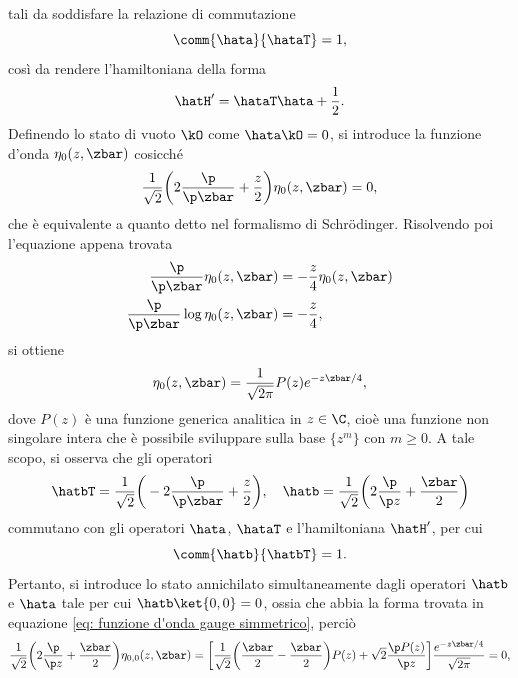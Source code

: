tali da soddisfare la relazione di commutazione 
\begin{equation}
    \comm{\hata}{\hataT} = 1,
\end{equation}
così da rendere l'hamiltoniana della forma
\begin{equation}
    \hatH' = \hataT\hata + \frac{1}{2}.
\end{equation}
Definendo lo stato di vuoto $\kO$ come $\hata\kO = 0$, si introduce la funzione d'onda $\eta_0(z,\zbar )$ cosicché 
\begin{equation}
\label{eq: funzione d'onda gauge simmetrico}
    \frac{1}{\sqrt{2}}\bigg(2\frac{\p}{\p \zbar } + \frac{z}{2}\bigg)\eta_0(z,\zbar ) = 0,
\end{equation}
che è equivalente a quanto detto nel formalismo di Schr\"odinger. Risolvendo poi l'equazione appena trovata
\begin{align}
    \frac{\p}{\p\zbar }\eta_0(z,\zbar) &= -\frac{z}{4}\eta_0(z,\zbar) \\
    \frac{\p}{\p\zbar}\log{\eta_0(z,\zbar)} &= -\frac{z}{4},
\end{align}
si ottiene
\begin{equation}
    \eta_0(z,\zbar) = \frac{1}{\sqrt{2\pi}}P(z)e^{-z\zbar/4},
\end{equation}
dove $P(z)$ è una funzione generica analitica in $z \in \C$, cioè una funzione non singolare intera che è possibile sviluppare sulla base $\{z^m\}$ con $m \ge 0$. A tale scopo, si osserva che gli operatori 
\begin{equation}
    \hatbT = \frac{1}{\sqrt{2}}\bigg(-2\frac{\p}{\p\zbar} + \frac{z}{2} \bigg),\quad \hatb = \frac{1}{\sqrt{2}}\bigg(2\frac{\p}{\p z} + \frac{\zbar}{2} \bigg) 
\end{equation}
commutano con gli operatori $\hata$, $\hataT$ e l'hamiltoniana $\hatH'$, per cui 
\begin{equation}
    \comm{\hatb}{\hatbT} = 1.
\end{equation}
Pertanto, si introduce lo stato annichilato simultaneamente dagli operatori $\hatb$ e $\hata$ tale per cui $\hatb\ket{0,0} = 0$, ossia che abbia la forma trovata in equazione \eqref{eq: funzione d'onda gauge simmetrico}, perciò
\begin{equation}
    \frac{1}{\sqrt{2}}\bigg(2\frac{\p}{\p z} + \frac{\zbar}{2} \bigg)\eta_{0,0}(z,\zbar) = \bigg[\frac{1}{\sqrt{2}}\bigg(\frac{\zbar}{2} - \frac{\zbar}{2}\bigg)P(z) + \sqrt{2}\frac{\p P(z)}{\p z}\bigg]\frac{e^{-z\zbar/4}}{\sqrt{2\pi}} = 0,
\end{equation}
